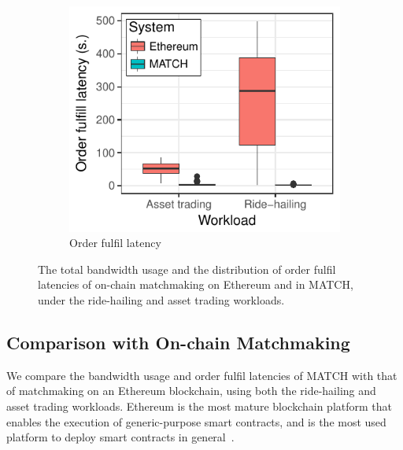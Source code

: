 \begin{figure}[t!]
\begin{subfigure}{.5\columnwidth}
		\label{fig:ethereum_memory}
	\end{subfigure}\vspace{0.3cm}
	\begin{subfigure}{.5\columnwidth}
		\centering
		\includegraphics[width=\columnwidth]{match/assets/plots/ethereum_experiment_latencies.pdf}
		\caption{Order fulfil latency}
		\label{fig:ethereum_latencies}
	\end{subfigure}
	\caption{The total bandwidth usage and the distribution of order fulfil latencies of on-chain matchmaking on Ethereum and in MATCH, under the ride-hailing and asset trading workloads.}
	\label{fig:ethereum_experiments}
\end{figure}

\subsection{Comparison with On-chain Matchmaking}
\label{sec:experiments_ethereum}
We compare the bandwidth usage and order fulfil latencies of MATCH with that of matchmaking on an Ethereum blockchain, using both the ride-hailing and asset trading workloads.
Ethereum is the most mature blockchain platform that enables the execution of generic-purpose smart contracts, and is the most used platform to deploy smart contracts in general~\cite{wood2014ethereum}.

